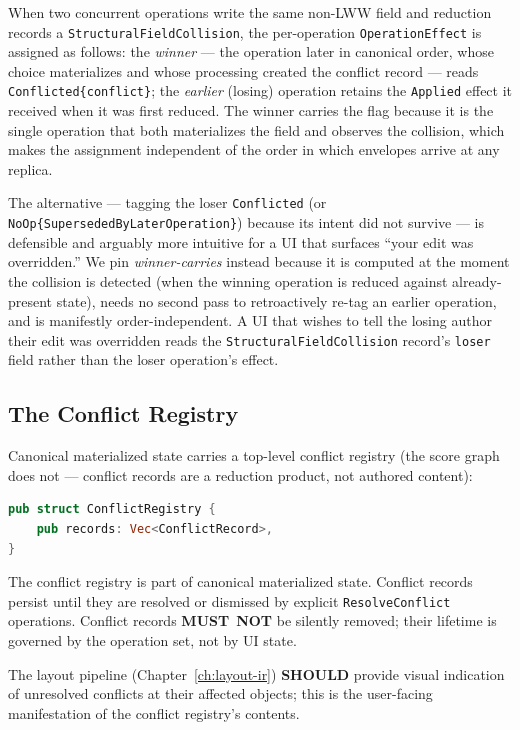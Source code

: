 \documentclass[11pt,letterpaper]{report}
\newcounter{requirement}[chapter]
\newcommand{\MUSTNOT}{\textbf{MUST}\nobreak\ \textbf{NOT}}
\newcommand{\SHOULD}{\textbf{SHOULD}}
\begin{document}
\begin{requirement}
  \label{req:semops:field-collision-effect}
  When two concurrent operations write the same non-LWW field and
  reduction records a \texttt{StructuralFieldCollision}, the
  per-operation \texttt{OperationEffect} is assigned as follows: the
  \emph{winner} --- the operation later in canonical order, whose
  choice materializes and whose processing created the conflict record
  --- reads \texttt{Conflicted\{conflict\}}; the \emph{earlier}
  (losing) operation retains the \texttt{Applied} effect it received
  when it was first reduced. The winner carries the flag because it is
  the single operation that both materializes the field and observes
  the collision, which makes the assignment independent of the order
  in which envelopes arrive at any replica.
\end{requirement}

\begin{rationale}
  The alternative --- tagging the loser \texttt{Conflicted} (or
  \texttt{NoOp\{SupersededByLaterOperation\}}) because its intent did
  not survive --- is defensible and arguably more intuitive for a UI
  that surfaces ``your edit was overridden.'' We pin
  \emph{winner-carries} instead because it is computed at the moment
  the collision is detected (when the winning operation is reduced
  against already-present state), needs no second pass to retroactively
  re-tag an earlier operation, and is manifestly order-independent. A
  UI that wishes to tell the losing author their edit was overridden
  reads the \texttt{StructuralFieldCollision} record's \texttt{loser}
  field rather than the loser operation's effect.
\end{rationale}

\subsection{The Conflict Registry}

Canonical materialized state carries a top-level conflict registry
(the score graph does not --- conflict records are a reduction
product, not authored content):

\begin{lstlisting}[language=Rust]
pub struct ConflictRegistry {
    pub records: Vec<ConflictRecord>,
}
\end{lstlisting}

\begin{requirement}
  \label{req:semops:conflict-registry-persistence}
  The conflict registry is part of canonical materialized state.
  Conflict records persist until they are resolved or dismissed by
  explicit \texttt{ResolveConflict} operations. Conflict records
  \MUSTNOT{} be silently removed; their lifetime is governed by
  the operation set, not by UI state.

  The layout pipeline (Chapter~\ref{ch:layout-ir}) \SHOULD{} provide
  visual indication of unresolved conflicts at their affected
  objects; this is the user-facing manifestation of the conflict
  registry's contents.
\end{requirement}
\end{document}
